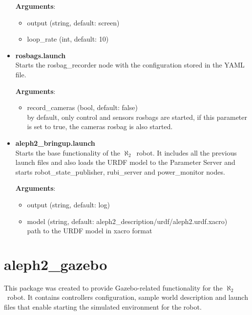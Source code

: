 \documentclass[english,inz,shortabstract]{iithesis}
\newcommand{\val}[1]{\textbf{\textsf{#1}}}
\newcommand{\rovername}{$\aleph_2$\ }
\begin{document}
\begin{itemize}
			\textbf{Arguments}:
			\begin{itemize}[itemsep=0pt, parsep=2pt, topsep=0pt]
				\item \textsf{output} (\textsf{string}, default: \textsf{screen})
				\item \textsf{loop\_rate} (\textsf{int}, default: \textsf{10})
			\end{itemize}

			\item \val{rosbags.launch}\\
			Starts the \textsf{rosbag\_recorder} node with the configuration stored in the YAML file.

			\textbf{Arguments}:
			\begin{itemize}[itemsep=0pt, parsep=2pt, topsep=0pt]
				\item \textsf{record\_cameras} (\textsf{bool}, default: \textsf{false})\\
				by default, only \textsf{control} and \textsf{sensors} rosbags are started, if this parameter is set to \textsf{true}, the \textsf{cameras} rosbag is also started. 
			\end{itemize}

			\item \val{aleph2\_bringup.launch}\\
			Starts the base functionality of the \rovername robot. It includes all the previous launch files and also loads the URDF model to the Parameter Server and starts \textsf{robot\_state\_publisher}, \textsf{rubi\_server} and \textsf{power\_monitor} nodes.

			\textbf{Arguments}:
			\begin{itemize}[itemsep=0pt, parsep=2pt, topsep=0pt]
				\item \textsf{output} (\textsf{string}, default: \textsf{log})
				\item \textsf{model} (\textsf{string}, default: \textsf{aleph2\_description/urdf/aleph2.urdf.xacro})\\
				path to the URDF model in xacro format
			\end{itemize}


		\end{itemize}

\section{aleph2\_gazebo}
This package was created to provide Gazebo-related functionality for the \rovername robot. It contains controllers configuration, sample world description and launch files that enable starting the simulated environment for the robot.
\end{document}
